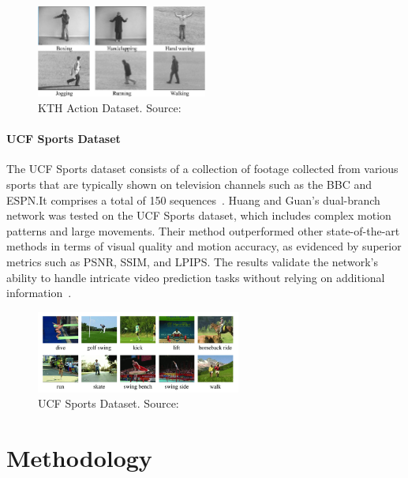 \documentclass[12pt,oneside]{book} %
\begin{document}
\begin{figure}[H]
    \centering
    \includegraphics[width=0.5\textwidth]{figures/KTH-dataset.png}
    \caption{KTH Action Dataset. Source:~\citet{KTH}}\label{fig:kth-action-dataset}
\end{figure}

\subsubsection*{UCF Sports Dataset}

The UCF Sports dataset consists of a collection of footage collected from
various sports that are typically shown on television channels such as the BBC
and ESPN.\@ It comprises a total of 150 sequences~\cite{UCFSport}. Huang and
Guan's dual-branch network was tested on the UCF Sports dataset, which includes
complex motion patterns and large movements. Their method outperformed other
state-of-the-art methods in terms of visual quality and motion accuracy, as
evidenced by superior metrics such as PSNR, SSIM, and LPIPS. The results
validate the network's ability to handle intricate video prediction tasks
without relying on additional information~\cite{
    DualBranchSpatialTemporalLearningNetworkVideoPrediction}.

\begin{figure}[H]
    \centering
    \includegraphics[width=0.6\textwidth]{figures/ucf-sport-dataset.png}
    \caption{UCF Sports Dataset. Source:~\citet{UCFSport}}\label{fig:ucf-sports-dataset}
\end{figure}

\chapter{Methodology}\label{chap:methodology}
\end{document}
